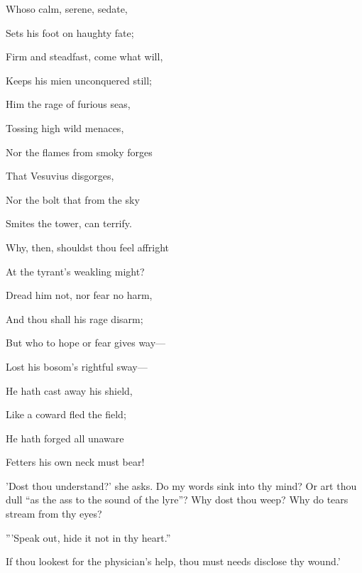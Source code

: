 
Whoso calm, serene, sedate,

Sets his foot on haughty fate;

Firm and steadfast, come what will,

Keeps his mien unconquered still;

Him the rage of furious seas,

Tossing high wild menaces,

Nor the flames from smoky forges

That Vesuvius disgorges,

Nor the bolt that from the sky

Smites the tower, can terrify.

Why, then, shouldst thou feel affright

At the tyrant's weakling might?

Dread him not, nor fear no harm,

And thou shall his rage disarm;

But who to hope or fear gives way—

Lost his bosom's rightful sway—

He hath cast away his shield,

Like a coward fled the field;

He hath forged all unaware

Fetters his own neck must bear!


'Dost thou understand?' she asks. Do my words sink into thy mind? Or art
thou dull ``as the ass to the sound of the lyre''? Why dost thou weep? Why
do tears stream from thy eyes?

'''Speak out, hide it not in thy heart.''

If thou lookest for the physician's help, thou must needs disclose thy
wound.'

